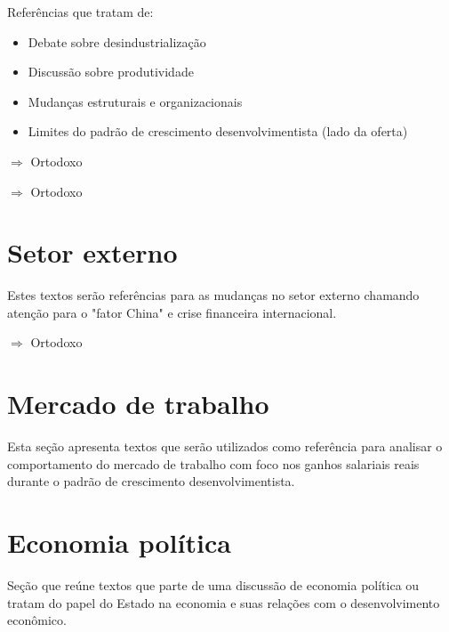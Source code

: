 \documentclass[12pt]{report}
\begin{document}
Referências que tratam de:

\begin{itemize}
\item Debate sobre desindustrialização
\item Discussão sobre produtividade
\item Mudanças estruturais e organizacionais
\item Limites do padrão de crescimento desenvolvimentista (lado da oferta)
\end{itemize}


 
  $\Rightarrow$ Ortodoxo
 


 $\Rightarrow$ Ortodoxo






\section{Setor externo}

Estes textos serão referências para as mudanças no setor externo chamando atenção para o "fator China" e crise financeira internacional.


 $\Rightarrow$ Ortodoxo


\section{Mercado de trabalho}

Esta seção apresenta textos que serão utilizados como referência para analisar o comportamento do mercado de trabalho com foco nos ganhos salariais reais durante o padrão de crescimento desenvolvimentista.



\section{Economia política}

Seção que reúne textos que parte de uma discussão de economia política ou tratam do papel do Estado na economia e suas relações com o desenvolvimento econômico.
\end{document}
